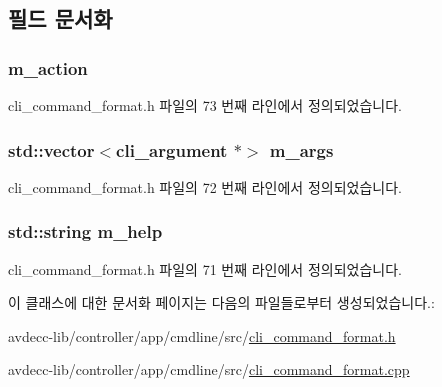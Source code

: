 \subsection{필드 문서화}
\subsubsection[{\texorpdfstring{m\+\_\+action}{m_action}}]{ m\+\_\+action\hspace{0.3cm}{\ttfamily [private]}}\hypertarget{classcli__command__format_a916e0e89f5ab664eb3cbcc7c2401a0df}{}\label{classcli__command__format_a916e0e89f5ab664eb3cbcc7c2401a0df}


cli\+\_\+command\+\_\+format.\+h 파일의 73 번째 라인에서 정의되었습니다.

\subsubsection[{\texorpdfstring{m\+\_\+args}{m_args}}]{\setlength{\rightskip}{0pt plus 5cm}std\+::vector$<${\bf cli\+\_\+argument} $\ast$$>$ m\+\_\+args\hspace{0.3cm}{\ttfamily [private]}}\hypertarget{classcli__command__format_a5a62a08dfd884e04cb69fa9427ff060c}{}\label{classcli__command__format_a5a62a08dfd884e04cb69fa9427ff060c}


cli\+\_\+command\+\_\+format.\+h 파일의 72 번째 라인에서 정의되었습니다.

\subsubsection[{\texorpdfstring{m\+\_\+help}{m_help}}]{\setlength{\rightskip}{0pt plus 5cm}std\+::string m\+\_\+help\hspace{0.3cm}{\ttfamily [private]}}\hypertarget{classcli__command__format_a3985971d45415a337f60ed183b445c96}{}\label{classcli__command__format_a3985971d45415a337f60ed183b445c96}


cli\+\_\+command\+\_\+format.\+h 파일의 71 번째 라인에서 정의되었습니다.



이 클래스에 대한 문서화 페이지는 다음의 파일들로부터 생성되었습니다.\+:\begin{DoxyCompactItemize}
\item 
avdecc-\/lib/controller/app/cmdline/src/\hyperlink{cli__command__format_8h}{cli\+\_\+command\+\_\+format.\+h}\item 
avdecc-\/lib/controller/app/cmdline/src/\hyperlink{cli__command__format_8cpp}{cli\+\_\+command\+\_\+format.\+cpp}\end{DoxyCompactItemize}
